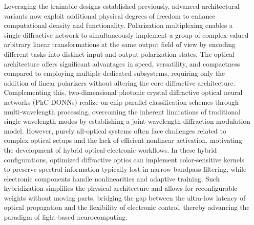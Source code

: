 Leveraging the trainable designs established previously, advanced architectural variants now exploit additional physical degrees of freedom to enhance computational density and functionality. Polarization multiplexing enables a single diffractive network to simultaneously implement a group of complex-valued arbitrary linear transformations at the same output field of view by encoding different tasks into distinct input and output polarization states. \citep{doi_10_1038_s41377_022_00849_x_e31226af} The optical architecture offers significant advantages in speed, versatility, and compactness compared to employing multiple dedicated subsystems, requiring only the addition of linear polarizers without altering the core diffractive architecture. Complementing this, two-dimensional photonic crystal diffractive optical neural networks (PhC-DONNs) realize on-chip parallel classification schemes through multi-wavelength processing, overcoming the inherent limitations of traditional single-wavelength modes by establishing a joint wavelength-diffraction modulation model. However, purely all-optical systems often face challenges related to complex optical setups and the lack of efficient nonlinear activation, motivating the development of hybrid optical-electronic workflows. In these hybrid configurations, optimized diffractive optics can implement color-sensitive kernels to preserve spectral information typically lost in narrow bandpass filtering, while electronic components handle nonlinearities and adaptive training. Such hybridization simplifies the physical architecture and allows for reconfigurable weights without moving parts, bridging the gap between the ultra-low latency of optical propagation and the flexibility of electronic control, thereby advancing the paradigm of light-based neurocomputing. \citep{doi_10_1038_s41377_022_00849_x_e31226af} \citep{doi_10_1515_nanoph_2025_0168_86a0f7aa} \citep{doi_10_1038_s41598_018_30619_y_5f5bfb09} \citep{doi_10_1364_oe_462370_1269b480}

